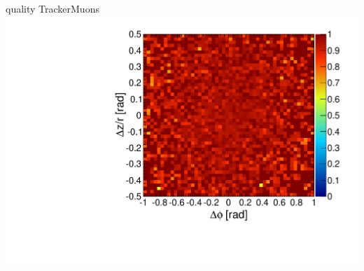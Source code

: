 \documentclass[compress]{beamer}
\begin{document}
\begin{frame}
\begin{columns}
\centering quality TrackerMuons
\includegraphics[width=\linewidth]{barrel_dphidr_TrackerMuon.pdf}
\end{columns}
\end{frame}
\end{document}
